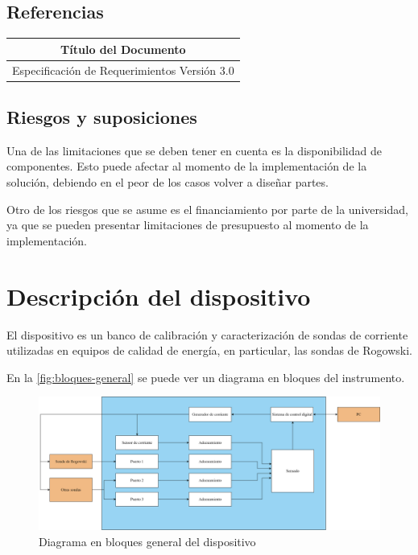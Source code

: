 \documentclass[titlepage, 12pt]{article}
\begin{document}
  \subsection{Referencias}
  \begin{table}[H]
    \centering
    \begin{tabular}{|c|}
    \hline
      \rowcolor[HTML]{C0C0C0}
      Título del Documento                           \\ \hline
      Especificación de Requerimientos Versión 3.0   \\ \hline
    \end{tabular}
  \end{table}

  \subsection{Riesgos y suposiciones}
  Una de las limitaciones que se deben tener en cuenta es la disponibilidad de componentes. Esto puede afectar al momento de la implementación de la solución, debiendo en el peor de los casos volver a diseñar partes.

  Otro de los riesgos que se asume es el financiamiento por parte de la universidad, ya que se pueden presentar limitaciones de presupuesto al momento de la implementación.


  \section{Descripción del dispositivo}
  El dispositivo es un banco de calibración y caracterización de sondas de corriente utilizadas en equipos de calidad de energía, en particular, las sondas de Rogowski.

  En la \autoref{fig:bloques-general} se puede ver un diagrama en bloques del instrumento.

  \begin{figure}[!htbp]
    \centering
    \includegraphics[width=\textwidth]{diagrams/bloques-general.png}
    \caption{Diagrama en bloques general del dispositivo}
    \label{fig:bloques-general}
  \end{figure}
\end{document}
